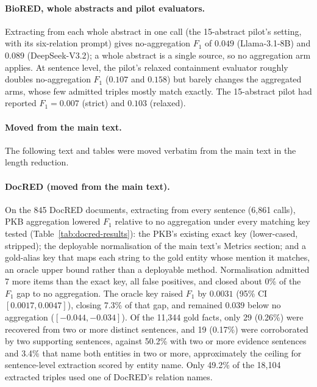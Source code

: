 \documentclass[11pt]{article}
\begin{document}
\paragraph{BioRED, whole abstracts and pilot evaluators.} Extracting from
each whole abstract in one call (the 15-abstract pilot's setting, with
its six-relation prompt) gives no-aggregation $F_1$ of $0.049$
(Llama-3.1-8B) and $0.089$ (DeepSeek-V3.2); a whole abstract is a single
source, so no aggregation arm applies. At sentence level, the pilot's
relaxed containment evaluator roughly doubles no-aggregation $F_1$
($0.107$ and $0.158$) but barely changes the aggregated arms, whose few
admitted triples mostly match exactly. The 15-abstract pilot had
reported $F_1=0.007$ (strict) and $0.103$ (relaxed).


\paragraph{Moved from the main text.} The following text and tables were moved verbatim from the main text in the length reduction.

\paragraph{DocRED (moved from the main text).}

On the 845 DocRED documents, extracting from every sentence (6,861
calls), PKB aggregation lowered $F_1$ relative to no aggregation under
every matching key tested (Table~\ref{tab:docred-results}): the PKB's
existing exact key (lower-cased, stripped); the deployable normalisation
of the main text's Metrics section; and a gold-alias key that maps each
string to the gold entity whose mention it matches, an oracle upper
bound rather than a deployable method. Normalisation admitted 7 more
items than the exact key, all false positives, and closed about 0\% of
the $F_1$ gap to no aggregation. The oracle key raised $F_1$ by $0.0031$
(95\% CI $[0.0017, 0.0047]$), closing 7.3\% of that gap, and remained
$0.039$ below no aggregation ($[-0.044, -0.034]$). Of the 11,344 gold
facts, only 29 (0.26\%) were recovered from two or more distinct
sentences, and 19 (0.17\%) were corroborated by two supporting
sentences, against 50.2\% with two or more evidence sentences and 3.4\%
that name both entities in two or more, approximately the ceiling for
sentence-level extraction scored by entity name. Only 49.2\% of the
18,104 extracted triples used one of DocRED's relation names.
\end{document}
